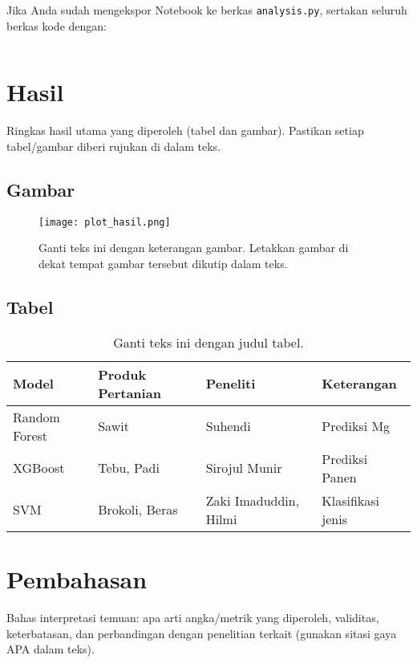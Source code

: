 \documentclass[11pt,a4paper]{article}
\begin{document}
Jika Anda sudah mengekspor Notebook ke berkas \texttt{analysis.py}, sertakan seluruh berkas kode dengan:
\begin{verbatim}

\end{verbatim}

\section{Hasil}
Ringkas hasil utama yang diperoleh (tabel dan gambar). Pastikan setiap tabel/gambar diberi rujukan di dalam teks.

\subsection{Gambar}
\begin{figure}[H]
  \centering
  \texttt{[image: plot\_hasil.png]} %
  \caption{Ganti teks ini dengan keterangan gambar. Letakkan gambar di dekat tempat gambar tersebut dikutip dalam teks.}
  \label{fig:hasil-utama}
\end{figure}

\subsection{Tabel}
\begin{table}[H]
  \centering
  \caption{Ganti teks ini dengan judul tabel.}
  \begin{tabular}{@{}lllp{6.5cm}@{}}
    \toprule
    \textbf{Model} & \textbf{Produk Pertanian} & \textbf{Peneliti} & \textbf{Keterangan} \\
    \midrule
    Random Forest & Sawit & Suhendi & Prediksi Mg \\
    XGBoost & Tebu, Padi & Sirojul Munir & Prediksi Panen \\
    SVM & Brokoli, Beras & Zaki Imaduddin, Hilmi & Klasifikasi jenis \\
    \bottomrule
  \end{tabular}
  \label{tab:contoh}
\end{table}

\section{Pembahasan}
Bahas interpretasi temuan: apa arti angka/metrik yang diperoleh, validitas, keterbatasan, dan perbandingan dengan penelitian terkait (gunakan sitasi gaya APA dalam teks).
\end{document}
